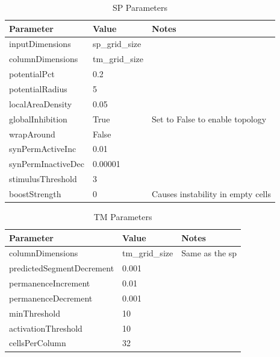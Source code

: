 \begin{table}[H]
    \centering
    \begin{tabularx}{\linewidth}{@{}XlX@{}}
        \toprule
        \textbf{Parameter} & \textbf{Value} & \textbf{Notes}                    \\
        \midrule
        inputDimensions    & sp\_grid\_size &                                   \\
        columnDimensions   & tm\_grid\_size &                                   \\
        potentialPct       & 0.2            &                                   \\
        potentialRadius    & 5              &                                   \\
        localAreaDensity   & 0.05           &                                   \\
        globalInhibition   & True           & Set to False to enable topology   \\
        wrapAround         & False          &                                   \\
        synPermActiveInc   & 0.01           &                                   \\
        synPermInactiveDec & 0.00001                                            \\
        stimulusThreshold  & 3              &                                   \\
        boostStrength      & 0              & Causes instability in empty cells \\
        \bottomrule
    \end{tabularx}
    \caption{SP Parameters}
    \label{tab:surveillance_sp}
\end{table}
\begin{table}[H]
    \centering
    \begin{tabularx}{\linewidth}{@{}XlX@{}}
        \toprule
        \textbf{Parameter}        & \textbf{Value} & \textbf{Notes}        \\
        \midrule
        columnDimensions          & tm\_grid\_size & Same as the \gls*{sp} \\
        predictedSegmentDecrement & 0.001          &                       \\
        permanenceIncrement       & 0.01           &                       \\
        permanenceDecrement       & 0.001          &                       \\
        minThreshold              & 10             &                       \\
        activationThreshold       & 10             &                       \\
        cellsPerColumn            & 32             &                       \\
        \bottomrule
    \end{tabularx}
    \caption{TM Parameters}
    \label{tab:surveillance_tm}
\end{table}
